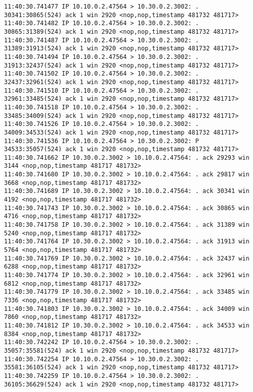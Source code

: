 \documentclass[a4paper,12pt]{article}
\begin{document}
\begin{lstlisting}
11:40:30.741477 IP 10.10.0.2.47564 > 10.30.0.2.3002: . 30341:30865(524) ack 1 win 2920 <nop,nop,timestamp 481732 481717>
11:40:30.741482 IP 10.10.0.2.47564 > 10.30.0.2.3002: . 30865:31389(524) ack 1 win 2920 <nop,nop,timestamp 481732 481717>
11:40:30.741487 IP 10.10.0.2.47564 > 10.30.0.2.3002: . 31389:31913(524) ack 1 win 2920 <nop,nop,timestamp 481732 481717>
11:40:30.741494 IP 10.10.0.2.47564 > 10.30.0.2.3002: . 31913:32437(524) ack 1 win 2920 <nop,nop,timestamp 481732 481717>
11:40:30.741502 IP 10.10.0.2.47564 > 10.30.0.2.3002: . 32437:32961(524) ack 1 win 2920 <nop,nop,timestamp 481732 481717>
11:40:30.741510 IP 10.10.0.2.47564 > 10.30.0.2.3002: . 32961:33485(524) ack 1 win 2920 <nop,nop,timestamp 481732 481717>
11:40:30.741518 IP 10.10.0.2.47564 > 10.30.0.2.3002: . 33485:34009(524) ack 1 win 2920 <nop,nop,timestamp 481732 481717>
11:40:30.741526 IP 10.10.0.2.47564 > 10.30.0.2.3002: . 34009:34533(524) ack 1 win 2920 <nop,nop,timestamp 481732 481717>
11:40:30.741536 IP 10.10.0.2.47564 > 10.30.0.2.3002: P 34533:35057(524) ack 1 win 2920 <nop,nop,timestamp 481732 481717>
11:40:30.741662 IP 10.30.0.2.3002 > 10.10.0.2.47564: . ack 29293 win 3144 <nop,nop,timestamp 481717 481732>
11:40:30.741680 IP 10.30.0.2.3002 > 10.10.0.2.47564: . ack 29817 win 3668 <nop,nop,timestamp 481717 481732>
11:40:30.741689 IP 10.30.0.2.3002 > 10.10.0.2.47564: . ack 30341 win 4192 <nop,nop,timestamp 481717 481732>
11:40:30.741743 IP 10.30.0.2.3002 > 10.10.0.2.47564: . ack 30865 win 4716 <nop,nop,timestamp 481717 481732>
11:40:30.741758 IP 10.30.0.2.3002 > 10.10.0.2.47564: . ack 31389 win 5240 <nop,nop,timestamp 481717 481732>
11:40:30.741764 IP 10.30.0.2.3002 > 10.10.0.2.47564: . ack 31913 win 5764 <nop,nop,timestamp 481717 481732>
11:40:30.741769 IP 10.30.0.2.3002 > 10.10.0.2.47564: . ack 32437 win 6288 <nop,nop,timestamp 481717 481732>
11:40:30.741774 IP 10.30.0.2.3002 > 10.10.0.2.47564: . ack 32961 win 6812 <nop,nop,timestamp 481717 481732>
11:40:30.741779 IP 10.30.0.2.3002 > 10.10.0.2.47564: . ack 33485 win 7336 <nop,nop,timestamp 481717 481732>
11:40:30.741803 IP 10.30.0.2.3002 > 10.10.0.2.47564: . ack 34009 win 7860 <nop,nop,timestamp 481717 481732>
11:40:30.741812 IP 10.30.0.2.3002 > 10.10.0.2.47564: . ack 34533 win 8384 <nop,nop,timestamp 481717 481732>
11:40:30.742242 IP 10.10.0.2.47564 > 10.30.0.2.3002: . 35057:35581(524) ack 1 win 2920 <nop,nop,timestamp 481732 481717>
11:40:30.742254 IP 10.10.0.2.47564 > 10.30.0.2.3002: . 35581:36105(524) ack 1 win 2920 <nop,nop,timestamp 481732 481717>
11:40:30.742259 IP 10.10.0.2.47564 > 10.30.0.2.3002: . 36105:36629(524) ack 1 win 2920 <nop,nop,timestamp 481732 481717>

\end{lstlisting}
\end{document}
